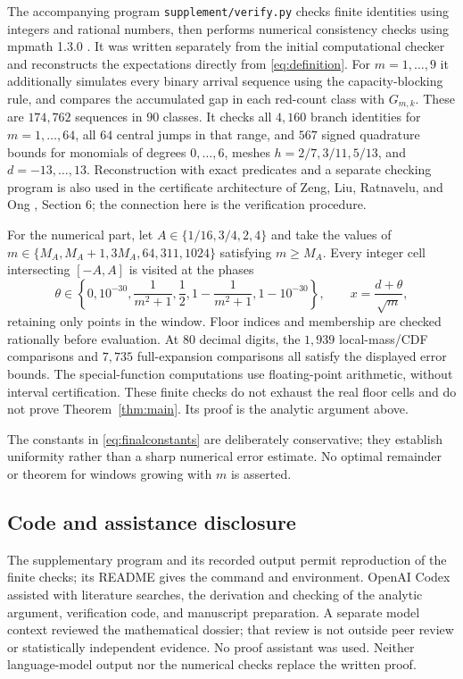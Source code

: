 \documentclass[11pt]{amsart}
\begin{document}
The accompanying program \texttt{supplement/verify.py} checks finite
identities using integers and rational numbers, then performs numerical
consistency checks using mpmath 1.3.0 \cite{mpmath}.
It was written separately from the initial computational checker and
reconstructs the expectations directly from \eqref{eq:definition}.
For $m=1,\ldots,9$ it additionally simulates every binary arrival
sequence using the capacity-blocking rule, and compares the accumulated
gap in each red-count class with $G_{m,k}$. These are $174{,}762$
sequences in $90$ classes. It checks all $4{,}160$ branch identities
for $m=1,\ldots,64$, all $64$ central jumps in that range, and $567$
signed quadrature bounds for monomials of degrees $0,\ldots,6$, meshes
$h=2/7,3/11,5/13$, and $d=-13,\ldots,13$.
Reconstruction with exact predicates and a separate checking program
is also used in the certificate architecture of Zeng, Liu, Ratnavelu,
and Ong \cite{Zeng2026Certificates}, Section 6; the connection here is
the verification procedure.

For the numerical part, let
$A\in\{1/16,3/4,2,4\}$ and take the values of
$m\in\{M_A,M_A+1,3M_A,64,311,1024\}$ satisfying $m\ge M_A$.
Every integer cell intersecting $[-A,A]$ is visited at the phases
\[
 \theta\in
 \left\{0,10^{-30},\frac1{m^2+1},\frac12,
                   1-\frac1{m^2+1},1-10^{-30}\right\},
 \qquad x=\frac{d+\theta}{\sqrt m},
\]
retaining only points in the window. Floor indices and membership are
checked rationally before evaluation. At $80$ decimal digits, the
$1{,}939$ local-mass/CDF comparisons and $7{,}735$ full-expansion
comparisons all satisfy the displayed error bounds.
The special-function computations use floating-point arithmetic,
without interval certification. These finite checks do not exhaust
the real floor cells and do not prove Theorem~\ref{thm:main}.
Its proof is the analytic argument above.

The constants in \eqref{eq:finalconstants} are deliberately conservative;
they establish uniformity rather than a sharp numerical error estimate.
No optimal remainder or theorem for windows growing with $m$ is asserted.

\subsection*{Code and assistance disclosure}
The supplementary program and its recorded output permit reproduction
of the finite checks; its README gives the command and environment.
OpenAI Codex assisted with literature searches, the derivation and
checking of the analytic argument, verification code, and manuscript
preparation. A separate model context reviewed the mathematical dossier;
that review is not outside peer review or statistically independent
evidence. No proof assistant was used. Neither language-model output
nor the numerical checks replace the written proof.



\end{document}
